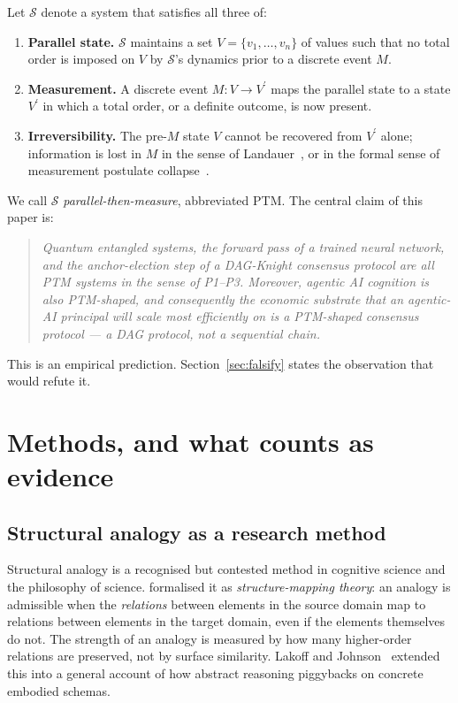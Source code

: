 \documentclass[11pt,a4paper]{article}
\begin{document}
Let $\mathcal{S}$ denote a system that satisfies all three of:
\begin{enumerate}[label=\textbf{P\arabic*.},leftmargin=2.6em]
  \item \textbf{Parallel state.} $\mathcal{S}$ maintains a set
  $V = \{v_1, \ldots, v_n\}$ of values such that no total order is
  imposed on $V$ by $\mathcal{S}$'s dynamics prior to a discrete event $M$.
  \item \textbf{Measurement.} A discrete event $M: V \to V^\prime$ maps the
  parallel state to a state $V^\prime$ in which a total order, or a
  definite outcome, is now present.
  \item \textbf{Irreversibility.} The pre-$M$ state $V$ cannot be recovered
  from $V^\prime$ alone; information is lost in $M$ in the sense of
  Landauer~\cite{landauer1961}, or in the formal sense of measurement
  postulate collapse~\cite{vonneumann1932}.
\end{enumerate}
We call $\mathcal{S}$ \emph{parallel-then-measure}, abbreviated PTM. The
central claim of this paper is:
\begin{quote}\itshape
Quantum entangled systems, the forward pass of a trained neural network,
and the anchor-election step of a DAG-Knight consensus protocol are all
PTM systems in the sense of P1--P3. Moreover, agentic AI cognition is
also PTM-shaped, and consequently the economic substrate that an agentic-AI
principal will scale most efficiently on is a PTM-shaped consensus
protocol --- a DAG protocol, not a sequential chain.
\end{quote}
This is an empirical prediction. Section~\ref{sec:falsify} states the
observation that would refute it.

\section{Methods, and what counts as evidence}\label{sec:methods}

\subsection{Structural analogy as a research method}

Structural analogy is a recognised but contested method in cognitive
science and the philosophy of science. \cite{gentner1983} formalised it as
\emph{structure-mapping theory}: an analogy is admissible when the
\emph{relations} between elements in the source domain map to relations
between elements in the target domain, even if the elements themselves do
not. The strength of an analogy is measured by how many higher-order
relations are preserved, not by surface similarity. Lakoff and
Johnson~\cite{lakoff1980} extended this into a general account of how
abstract reasoning piggybacks on concrete embodied schemas.
\end{document}

